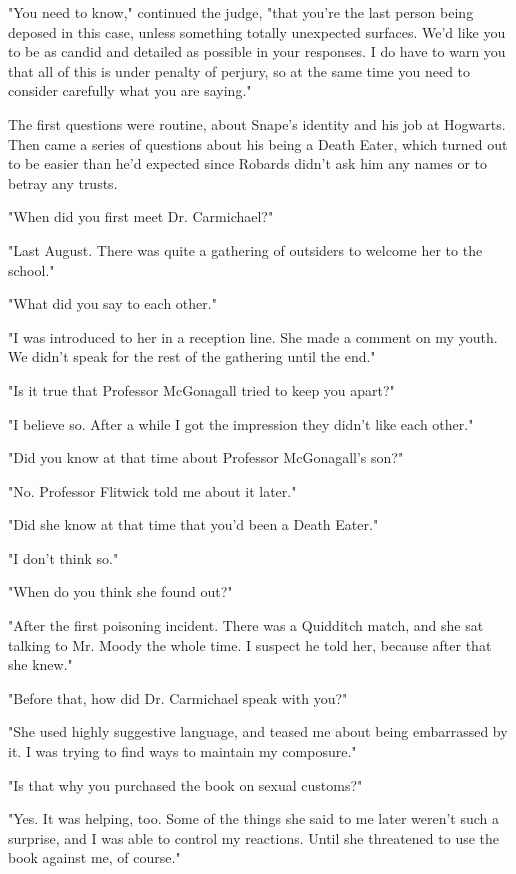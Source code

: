 \documentclass[a4paper,11pt]{article}
\begin{document}
"You need to know," continued the judge, "that you're the last person being deposed in this case, unless something totally unexpected surfaces. We'd like you to be as candid and detailed as possible in your responses. I do have to warn you that all of this is under penalty of perjury, so at the same time you need to consider carefully what you are saying."

The first questions were routine, about Snape's identity and his job at Hogwarts. Then came a series of questions about his being a Death Eater, which turned out to be easier than he'd expected since Robards didn't ask him any names or to betray any trusts.

"When did you first meet Dr. Carmichael?"

"Last August. There was quite a gathering of outsiders to welcome her to the school."

"What did you say to each other."

"I was introduced to her in a reception line. She made a comment on my youth. We didn't speak for the rest of the gathering until the end."

"Is it true that Professor McGonagall tried to keep you apart?"

"I believe so. After a while I got the impression they didn't like each other."

"Did you know at that time about Professor McGonagall's son?"

"No. Professor Flitwick told me about it later."

"Did she know at that time that you'd been a Death Eater."

"I don't think so."

"When do you think she found out?"

"After the first poisoning incident. There was a Quidditch match, and she sat talking to Mr. Moody the whole time. I suspect he told her, because after that she knew."

"Before that, how did Dr. Carmichael speak with you?"

"She used highly suggestive language, and teased me about being embarrassed by it. I was trying to find ways to maintain my composure."

"Is that why you purchased the book on sexual customs?"

"Yes. It was helping, too. Some of the things she said to me later weren't such a surprise, and I was able to control my reactions. Until she threatened to use the book against me, of course."
\end{document}
